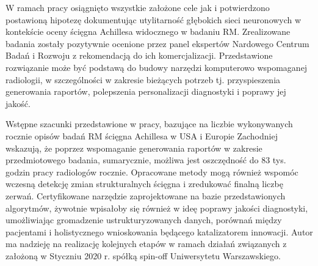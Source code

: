 W ramach pracy osiągnięto wszystkie założone cele jak i potwierdzono postawioną hipotezę dokumentując utylitarność głębokich sieci neuronowych w kontekście oceny ścięgna Achillesa widocznego w badaniu RM. Zrealizowane badania zostały pozytywnie ocenione przez panel ekspertów Nardowego Centrum Badań i Rozwoju z rekomendacją do ich komercjalizacji. Przedstawione rozwiązanie może być podstawą do budowy narzędzi komputerowo wspomaganej radiologii, w szczególności w zakresie bieżących potrzeb tj. przyspieszenia generowania raportów, polepszenia personalizacji diagnostyki i poprawy jej jakość.

Wstępne szacunki przedstawione w pracy, bazujące na liczbie wykonywanych rocznie opisów badań RM ścięgna Achillesa w USA i Europie Zachodniej wskazują, że poprzez wspomaganie generowania raportów w zakresie przedmiotowego badania, sumarycznie, możliwa jest oszczędność do 83 tys. godzin pracy radiologów rocznie. Opracowane metody mogą również wspomóc wczesną detekcję zmian strukturalnych ścięgna i zredukować finalną liczbę zerwań. Certyfikowane narzędzie zaprojektowane na bazie przedstawionych algorytmów, żywotnie wpisałoby się również w ideę poprawy jakości diagnostyki, umożliwiając gromadzenie ustrukturyzowanych danych, porównań między pacjentami i holistycznego wnioskowania będącego katalizatorem innowacji. Autor ma nadzieję na realizację kolejnych etapów w ramach działań związanych z założoną w Styczniu 2020 r. spółką spin-off Uniwersytetu Warszawskiego.

